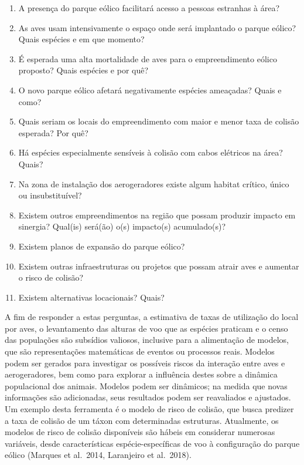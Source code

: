 \documentclass[
]{scrbook}
\providecommand{\tightlist}{%
  \setlength{\itemsep}{0pt}\setlength{\parskip}{0pt}}
\begin{document}
\begin{enumerate}
\def\labelenumi{\arabic{enumi}.}
\tightlist
\item
  A presença do parque eólico facilitará acesso a pessoas estranhas à área?
\item
  As aves usam intensivamente o espaço onde será implantado o parque eólico? Quais espécies e em que momento?
\item
  É esperada uma alta mortalidade de aves para o empreendimento eólico proposto? Quais espécies e por quê?
\item
  O novo parque eólico afetará negativamente espécies ameaçadas? Quais e como?
\item
  Quais seriam os locais do empreendimento com maior e menor taxa de colisão esperada? Por quê?
\item
  Há espécies especialmente sensíveis à colisão com cabos elétricos na área? Quais?
\item
  Na zona de instalação dos aerogeradores existe algum habitat crítico, único ou insubstituível?
\item
  Existem outros empreendimentos na região que possam produzir impacto em sinergia? Qual(is) será(ão) o(s) impacto(s) acumulado(s)?
\item
  Existem planos de expansão do parque eólico?
\item
  Existem outras infraestruturas ou projetos que possam atrair aves e aumentar o risco de colisão?
\item
  Existem alternativas locacionais? Quais?
\end{enumerate}

A fim de responder a estas perguntas, a estimativa de taxas de utilização do local por aves, o levantamento das alturas de voo que as espécies praticam e o censo das populações são subsídios valiosos, inclusive para a alimentação de modelos, que são representações matemáticas de eventos ou processos reais. Modelos podem ser gerados para investigar os possíveis riscos da interação entre aves e aerogeradores, bem como para explorar a influência destes sobre a dinâmica populacional dos animais. Modelos podem ser dinâmicos; na medida que novas informações são adicionadas, seus resultados podem ser reavaliados e ajustados. Um exemplo desta ferramenta é o modelo de risco de colisão, que busca predizer a taxa de colisão de um táxon com determinadas estruturas. Atualmente, os modelos de risco de colisão disponíveis são hábeis em considerar numerosas variáveis, desde características espécie-específicas de voo à configuração do parque eólico (Marques et al.~2014, Laranjeiro et al.~2018).
\end{document}
